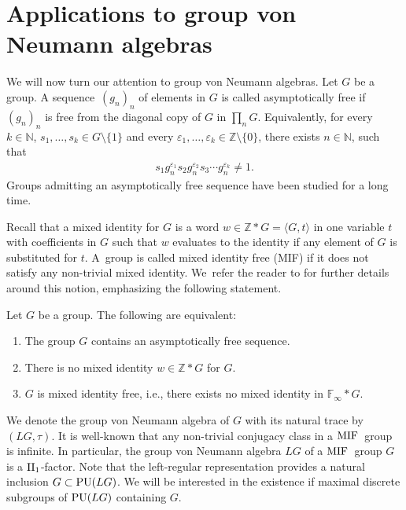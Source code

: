 \section{Applications to group von Neumann algebras}

We will now turn our attention to group von Neumann algebras. Let $G$ be a group. A sequ\-ence~$(g_n)_n$ of elements in $G$ is called asymptotically free if $(g_n)_n$ is free from the diagonal copy of $G$ in $\prod_n G$. Equivalently, for every $k \in \mathbb N$, $s_1,\dots,s_k \in G \setminus \{1\}$ and every $\varepsilon_1,\dots,\varepsilon_k \in \mathbb Z \setminus \{0\}$, there exists $n \in \mathbb N$, such that
\begin{gather*}
s_1 g_n^{\varepsilon_1} s_2 g_n^{\varepsilon_2} s_3 \cdots g_n^{\varepsilon_k} \neq 1.
\end{gather*}
Groups admitting an asymptotically free sequence have been studied for a long time.

Recall that a mixed identity for $G$ is a word $w \in \mathbb Z \ast G = \langle G, t\rangle$ in one variable $t$ with coefficients in $G$ such that $w$ evaluates to the identity if any element of $G$ is substituted for $t$. A~group is called mixed identity free (MIF) if it does not satisfy any non-trivial mixed identity. We~refer the reader to \cite{MR3556970} for further details around this notion, emphasizing the following statement.

\begin{Proposition}
Let $G$ be a group. The following are equivalent:
\begin{enumerate}\itemsep=0pt
\item[$1.$] The group $G$ contains an asymptotically free sequence.
\item[$2.$] There is no mixed identity $w \in \mathbb Z \ast G$ for $G$.
\item[$3.$] $G$ is mixed identity free, i.e., there exists no mixed identity in $\mathbb F_\infty \ast G$.
\end{enumerate}
\end{Proposition}

We denote the group von Neumann algebra of $G$ with its natural trace by $(LG,\tau)$. It is well-known that any non-trivial conjugacy class in a ${\rm MIF}$~group is infinite. In particular, the group von Neumann algebra $LG$ of a ${\rm MIF}$~group $G$ is a ${\rm II}_1$-factor. Note that the left-regular representation provides a natural inclusion $G \subset {\rm PU}(LG)$.
 We will be interested in the existence if maximal discrete subgroups of ${\rm PU}(LG)$ containing $G$.

